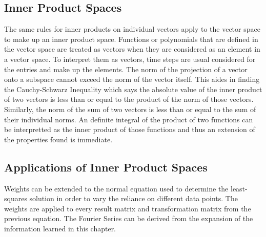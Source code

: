\documentclass[12pt]{article}
\begin{document}
\subsection{Inner Product Spaces}
The same rules for inner products on individual vectors apply to the vector space to make up an inner product space. Functions or polynomials that are defined in the vector space are treated 
as vectors when they are considered as an element in a vector space. To interpret them as vectors, time steps are usual considered for the entries and make up the elements. The norm 
of the projection of a vector onto a subspace cannot exceed the norm of the vector itself. This aides in finding the Cauchy-Schwarz Inequality which says the absolute value of the inner 
product of two vectors is less than or equal to the product of the norm of those vectors. Similarly, the norm of the sum of two vectors is less than or equal to the sum of their individual 
norms. An definite integral of the product of two functions can be interpretted as the inner product of those functions and thus an extension of the properties found is immediate. 
\subsection{Applications of Inner Product Spaces}
Weights can be extended to the normal equation used to determine the least-squares solution in order to vary the reliance on different data points. The weights are applied to every result 
matrix and transformation matrix from the previous equation. The Fourier Series can be derived from the expansion of the information learned in this chapter. 
\end{document}
